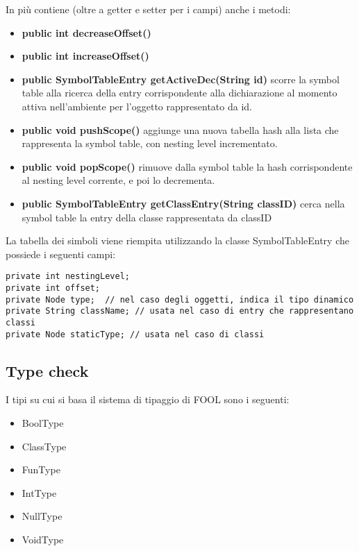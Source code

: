 \documentclass[a4paper]{article}   %
\begin{document}
In più contiene (oltre a getter e setter per i campi) anche i metodi:\\
\begin{itemize}
  \item \textbf{public int decreaseOffset()}
  \item \textbf{public int increaseOffset()}
  \item \textbf{public SymbolTableEntry getActiveDec(String id)} scorre la symbol table
  alla ricerca della entry corrispondente alla dichiarazione al momento attiva nell'ambiente per l'oggetto rappresentato da id.
  \item \textbf{public void pushScope()} aggiunge una nuova tabella hash alla lista che rappresenta la symbol table, con nesting level incrementato.
  \item \textbf{public void popScope()} rimuove dalla symbol table la hash corrispondente al nesting level corrente, e poi lo decrementa.
  \item \textbf{public SymbolTableEntry getClassEntry(String classID)} cerca nella symbol table la entry della classe rappresentata da classID

\end{itemize}

La tabella dei simboli viene riempita utilizzando la classe SymbolTableEntry che possiede i seguenti campi:
\begin{lstlisting}
private int nestingLevel;
private int offset;
private Node type;  // nel caso degli oggetti, indica il tipo dinamico
private String className; // usata nel caso di entry che rappresentano classi
private Node staticType; // usata nel caso di classi
\end{lstlisting}

\subsection{Type check}
I tipi su cui si basa il sistema di tipaggio di FOOL sono i seguenti:

\begin{itemize}
  \item BoolType
  \item ClassType
  \item FunType
  \item IntType
  \item NullType
  \item VoidType
\end{itemize}
\end{document}
